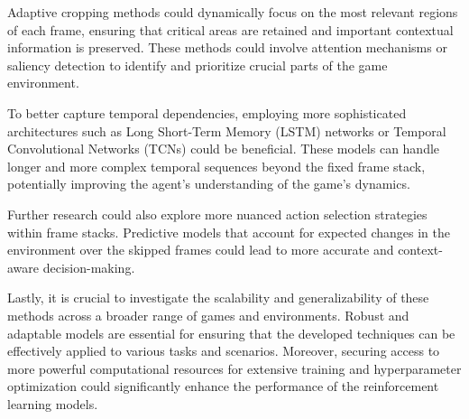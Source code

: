 Adaptive cropping methods could dynamically focus on the most relevant regions of each frame, ensuring that critical areas are retained and important contextual information is preserved. These methods could involve attention mechanisms or saliency detection to identify and prioritize crucial parts of the game environment.

To better capture temporal dependencies, employing more sophisticated architectures such as Long Short-Term Memory (LSTM) networks or Temporal Convolutional Networks (TCNs) could be beneficial. These models can handle longer and more complex temporal sequences beyond the fixed frame stack, potentially improving the agent's understanding of the game's dynamics.

Further research could also explore more nuanced action selection strategies within frame stacks. Predictive models that account for expected changes in the environment over the skipped frames could lead to more accurate and context-aware decision-making.

Lastly, it is crucial to investigate the scalability and generalizability of these methods across a broader range of games and environments. Robust and adaptable models are essential for ensuring that the developed techniques can be effectively applied to various tasks and scenarios. Moreover, securing access to more powerful computational resources for extensive training and hyperparameter optimization could significantly enhance the performance of the reinforcement learning models.
